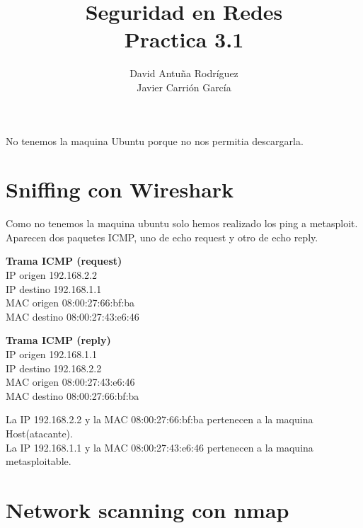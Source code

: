 \documentclass[11pt]{article}
\title{\Large Seguridad en Redes\\Practica 3.1}
\author{David Antuña Rodríguez\\Javier Carrión García}
\date{}
\begin{document}
  \raggedright

  \maketitle
  \newpage

  \par
  No tenemos la maquina Ubuntu porque no nos permitia descargarla.
  \section{Sniffing con Wireshark}
    \par
    Como no tenemos la maquina ubuntu solo hemos realizado los ping a metasploit. Aparecen dos
    paquetes ICMP, uno de echo request y otro de echo reply.

    \bigskip
    \par
    \textbf{Trama ICMP (request)}\\
    \hspace{5mm}IP origen 192.168.2.2\\
    \hspace{5mm}IP destino 192.168.1.1\\
    \hspace{5mm}MAC origen 08:00:27:66:bf:ba\\
    \hspace{5mm}MAC destino 08:00:27:43:e6:46\\

    \bigskip
    \par
    \textbf{Trama ICMP (reply)}\\
    \hspace{5mm}IP origen 192.168.1.1\\
    \hspace{5mm}IP destino 192.168.2.2\\
    \hspace{5mm}MAC origen 08:00:27:43:e6:46\\
    \hspace{5mm}MAC destino 08:00:27:66:bf:ba\\

    \bigskip
    \par
    La IP 192.168.2.2 y la MAC 08:00:27:66:bf:ba pertenecen a la maquina Host(atacante).\\
    La IP 192.168.1.1 y la MAC 08:00:27:43:e6:46 pertenecen a la maquina metasploitable.

  \section{Network scanning con nmap}
\end{document}
